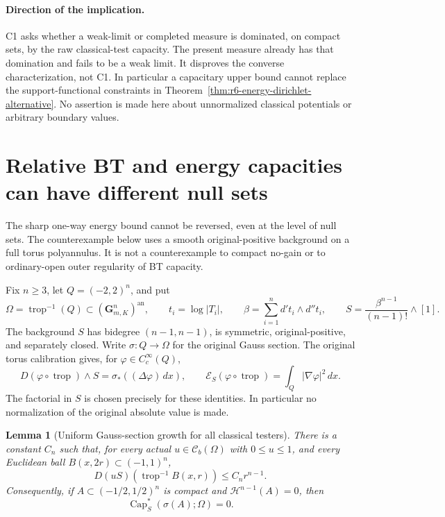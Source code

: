 \documentclass[11pt,a4paper]{article}
\numberwithin{equation}{section}
\newtheorem{lemma}[theorem]{Lemma}
\theoremstyle{definition}
\theoremstyle{remark}
\newcommand{\an}{\mathrm{an}}
\begin{document}
\paragraph{Direction of the implication.}
C1 asks whether a weak-limit or completed measure is dominated, on
compact sets, by the raw classical-test capacity. The present measure
already has that domination and fails to be a weak limit. It disproves
the converse characterization, not C1. In particular a capacitary
upper bound cannot replace the support-functional constraints in
Theorem~\ref{thm:r6-energy-dirichlet-alternative}. No assertion is made
here about unnormalized classical potentials or arbitrary boundary
values.



\section{Relative BT and energy capacities can have different null sets}
\label{sec:r6-capacity-energy-null-gap}

The sharp one-way energy bound cannot be reversed, even at the level of
null sets. The counterexample below uses a smooth original-positive
background on a full torus polyannulus. It is not a counterexample to
compact no-gain or to ordinary-open outer regularity of BT capacity.

Fix $n\ge3$, let $Q=(-2,2)^n$, and put
\[
 \Omega=\operatorname{trop}^{-1}(Q)\subset(\mathbf G_{m,K}^n)^{\an},
 \qquad t_i=\log|T_i|,\qquad
 \beta=\sum_{i=1}^n d't_i\wedge d''t_i,
 \qquad S=\frac{\beta^{n-1}}{(n-1)!}\wedge[1].
\]
The background $S$ has bidegree $(n-1,n-1)$, is symmetric,
original-positive, and separately closed. Write
$\sigma:Q\to\Omega$ for the original Gauss section. The original
torus calibration gives, for $\varphi\in C_c^\infty(Q)$,
\begin{equation}
 D(\varphi\circ\operatorname{trop})\wedge S
                  =\sigma_*((\Delta\varphi)\,dx),\qquad
 \mathcal E_S(\varphi\circ\operatorname{trop})
                  =\int_Q|\nabla\varphi|^2\,dx.
 \label{eq:r6-torus-laplace-calibration}
\end{equation}
The factorial in $S$ is chosen precisely for these identities. In
particular no normalization of the original absolute value is made.

\begin{lemma}[Uniform Gauss-section growth for all classical testers]
\label{lem:r6-gauss-lipschitz-capacity}
There is a constant $C_n$ such that, for every actual
$u\in\mathcal C_b(\Omega)$ with $0\le u\le1$, and every Euclidean
ball $B(x,2r)\subset(-1,1)^n$,
\begin{equation}
              D(uS)(\operatorname{trop}^{-1}B(x,r))
                                      \le C_n r^{n-1}.
 \label{eq:r6-uniform-gauss-ball-mass}
\end{equation}
Consequently, if $A\subset(-1/2,1/2)^n$ is compact and
$\mathcal H^{n-1}(A)=0$, then
\[
                    \operatorname{Cap}_S^*(\sigma(A);\Omega)=0.
\]
\end{lemma}
\end{document}
